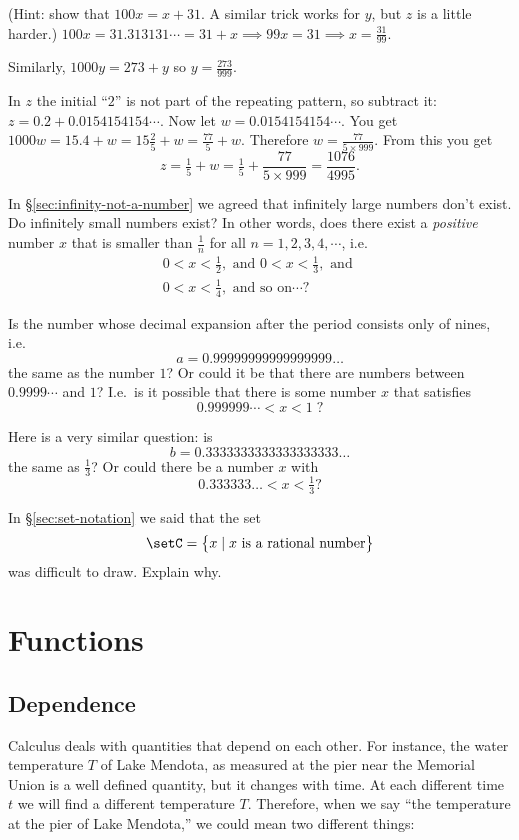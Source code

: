 \begin{multicols}{2}
(Hint: show that $100x=x+31$. A similar trick works for $y$, but $z$
is a little harder.)
\answer
$100x = 31.313131\cdots = 31+x \implies 99x = 31 \implies x =
\frac{31}{99}$.

Similarly, $1000y = 273 + y$ so $y= \frac{273}{999}$.

In $z$ the initial ``$2$'' is not part of the repeating pattern, so
subtract it:  $z = 0.2 + 0.0154154154\cdots$.  Now let
$w=0.0154154154\cdots$.  You get $1000w = 15.4+w = 15\frac25 + w =
\frac{77}{5}+w$. Therefore $w= \frac{77}{5\times 999}$.
From this you get
\[
z = \tfrac15+w = \tfrac15 +  \frac{77}{5\times999} = \frac{1076}{4995}.
\]
\endanswer

\problem \groupproblem\label{ex:no-infinitely-small-numbers}
\subprob In \S\ref{sec:infinity-not-a-number} we agreed that
infinitely large numbers don't exist. Do infinitely small numbers
exist?   In other words, does there exist a \emph{positive} number $x$
that is smaller than $\frac1n$ for all $n=1, 2, 3, 4, \cdots$, i.e.
\begin{gather*}
  0<x<\tfrac{1}{2}, \text{ and }
  0<x<\tfrac{1}{3}, \text{ and } \\
  0<x<\tfrac{1}{4}, \text{ and so on} \cdots?
\end{gather*}

\subprob
Is the number whose decimal expansion after the period consists only
of nines, i.e.
\[
a=0.99999999999999999\dots
\]
the same as the number $1$?  Or could it be that there are numbers
between $0.9999\cdots$ and $1$?  I.e.~is it possible that there is
some number $x$ that satisfies
\[
0.999999\cdots < x < 1 \; ?
\]

\subprob  Here is a very similar question:  is
\[
b=0.3333333333333333333\dots
\]
the same as $\frac13$?  Or could there be a number $x$ with
\[
0.333333\dots <x<\tfrac13 ?
\]

\problem In \S\ref{sec:set-notation} we said that the set
\[
\setC = \bigl\{x \mid \text{$x$ is a rational number}\bigr\}
\]
was difficult to draw.  Explain why.

\end{multicols}

\noproblemfont%

\section{Functions}

\subsection{Dependence}
Calculus deals with quantities that depend on each other.  For
instance, the water temperature $T$ of Lake Mendota, as measured at
the pier near the Memorial Union is a well defined quantity, but it
changes with time.  At each different time $t$ we will find a
different temperature $T$.  Therefore, when we say ``the temperature at
the pier of Lake Mendota,'' we could mean two different things:   

